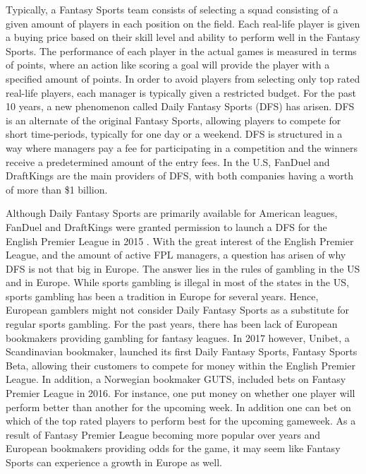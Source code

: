 \newpar
Typically, a Fantasy Sports team consists of selecting a squad consisting of a given amount of players in each position on the field. Each real-life player is given a buying price based on their skill level and ability to perform well in the Fantasy Sports. The performance of each player in the actual games is measured in terms of points, where an action like scoring a goal will provide the player with a specified amount of points. In order to avoid players from selecting only top rated real-life players, each manager is typically given a restricted budget.
\newpar
For the past 10 years, a new phenomenon called Daily Fantasy Sports (DFS) has arisen. DFS is an alternate of the original Fantasy Sports, allowing players to compete for short time-periods, typically for one day or a weekend. DFS is structured in a way where managers pay a fee for participating in a competition and the winners receive a predetermined amount of the entry fees. In the U.S, FanDuel and DraftKings are the main providers of DFS, with both companies having a worth of more than \$1 billion.

\newpar
Although Daily Fantasy Sports are primarily available for American leagues, FanDuel and DraftKings were granted permission to launch a DFS for the English Premier League in 2015 \citep{Purdum}. With the great interest of the English Premier League, and the amount of active FPL managers, a question has arisen of why DFS is not that big in Europe. The answer lies in the rules of gambling in the US and in Europe. While sports gambling is illegal in most of the states in the US, sports gambling has been a tradition in Europe for several years. Hence, European gamblers might not consider Daily Fantasy Sports as a substitute for regular sports gambling.  
\newpar
For the past years, there has been lack of European bookmakers providing gambling for fantasy leagues. In 2017 however, Unibet, a Scandinavian bookmaker, launched its first Daily Fantasy Sports, Fantasy Sports Beta, allowing their customers to compete for money within the English Premier League. In addition, a Norwegian bookmaker GUTS, included bets on Fantasy Premier League in 2016. For instance, one put money on whether one player will perform better than another for the upcoming week. In addition one can bet on which of the top rated players to perform best for the upcoming gameweek. As a result of Fantasy Premier League becoming more popular over years and European bookmakers providing odds for the game, it may seem like Fantasy Sports can experience a growth in Europe as well. 

